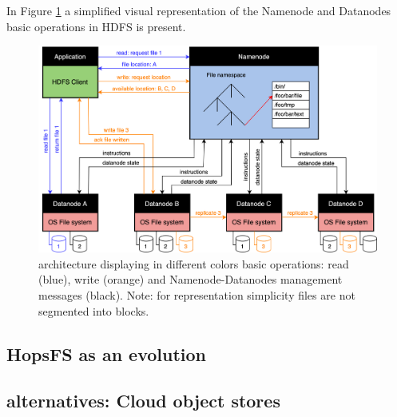In Figure \ref{fig:hdfs} a simplified visual representation of the Namenode and Datanodes basic operations in \gls{HDFS} is present.

\begin{figure}[!ht]
    \begin{center}
      \includegraphics[width=\textwidth]{figures/2-background/HDFS.png}
    \end{center}
    \caption{ architecture displaying in different colors basic operations: read (blue), write (orange) and Namenode-Datanodes management messages (black). Note: for representation simplicity files are not segmented into blocks.}
    \label{fig:hdfs}
\end{figure}
 
\subsection{\gls{HopsFS} as an  evolution}



\subsection{ alternatives: Cloud object stores}